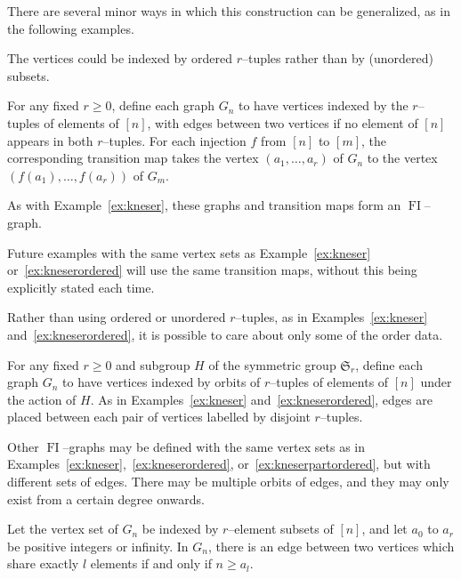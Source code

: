 \documentclass[ALCO,ThmDefs,Unicode,epreuves]{cedram}
\DeclareMathOperator{\FI}{FI}
\newcommand{\Sn}{\mathfrak{S}}
\begin{document}
There are several minor ways in which this construction can be generalized, as in the following examples. 

The vertices could be indexed by ordered $r$--tuples rather than by (unordered) subsets.

\begin{example}\label{ex:kneserordered}
For any fixed $r \geq 0$, define each graph $G_{n}$ to have vertices indexed by the $r$--tuples of elements of $[n]$, with edges between two vertices if no element of $[n]$ appears in both $r$--tuples. For each injection $f$ from $[n]$ to $[m]$, the corresponding transition map takes the vertex $(a_1,\dots,a_r)$ of $G_n$ to the vertex $(f(a_1),\dots,f(a_r))$ of $G_m$.

As with Example~\ref{ex:kneser}, these graphs and transition maps form an $\FI$--graph. 
\end{example}

Future examples with the same vertex sets as Example~\ref{ex:kneser} or~\ref{ex:kneserordered} will use the same transition maps, without this being explicitly stated each time.

Rather than using ordered or unordered $r$--tuples, as in Examples~\ref{ex:kneser} and~\ref{ex:kneserordered}, it is possible to care about only some of the order data.

\begin{example}\label{ex:kneserpartordered}
For any fixed $r \geq 0$ and subgroup $H$ of the symmetric group $\Sn_r$, define each graph $G_{n}$ to have vertices indexed by orbits of $r$--tuples of elements of $[n]$ under the action of $H$. As in Examples~\ref{ex:kneser} and~\ref{ex:kneserordered}, edges are placed between each pair of vertices labelled by disjoint $r$--tuples.
\end{example}

Other $\FI$--graphs may be defined with the same vertex sets as in Examples~\ref{ex:kneser},~\ref{ex:kneserordered}, or~\ref{ex:kneserpartordered}, but with different sets of edges. There may be multiple orbits of edges, and they may only exist from a certain degree onwards.

\begin{example}\label{ex:kneseredgeorbits}
Let the vertex set of $G_n$ be indexed by $r$--element subsets of $[n]$, and let $a_0$ to $a_r$ be positive integers or infinity. In $G_n$, there is an edge between two vertices which share exactly $l$ elements if and only if $n \geq a_l$. 
\end{example}
\end{document}
